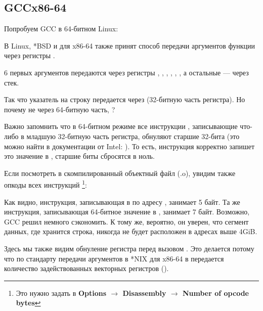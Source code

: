 \subsection{GCC\EMDASH{}x86-64}

Попробуем GCC в 64-битном Linux:



В Linux, *BSD и \MacOSX для x86-64 также принят способ передачи аргументов функции через регистры \cite{SysVABI}.

6 первых аргументов передаются через регистры \RDI, \RSI, \RDX, \RCX, , , а остальные --- через стек.

Так что указатель на строку передается через \EDI (32-битную часть регистра).
Но почему не через 64-битную часть, \RDI?

Важно запомнить что в 64-битном режиме все инструкции \MOV, записывающие что-либо в младшую 32-битную часть регистра, обнуляют старшие 32-бита (это можно найти в документации от Intel: ).
То есть, инструкция  корректно запишет это значение в \RAX, старшие биты сбросятся в ноль.

Если посмотреть в \IDA скомпилированный объектный файл (.o), увидим также опкоды всех инструкций
\footnote{Это нужно задать в \textbf{Options $\rightarrow$ Disassembly $\rightarrow$ Number of opcode bytes}}:



\label{hw_EDI_instead_of_RDI}
Как видно, инструкция, записывающая в \EDI по адресу , занимает 5 байт.
Та же инструкция, записывающая 64-битное значение в \RDI, занимает 7 байт.
Возможно, GCC решил немного сэкономить.
К тому же, вероятно, он уверен, что сегмент данных, где хранится строка, никогда не будет расположен в адресах выше 4\gls{GiB}.

\label{SysVABI_input_EAX}
Здесь мы также видим обнуление регистра \EAX перед вызовом \printf.
Это делается потому что по стандарту передачи аргументов в *NIX для x86-64 в \EAX передается количество задействованных векторных регистров
(\cite{SysVABI}).

